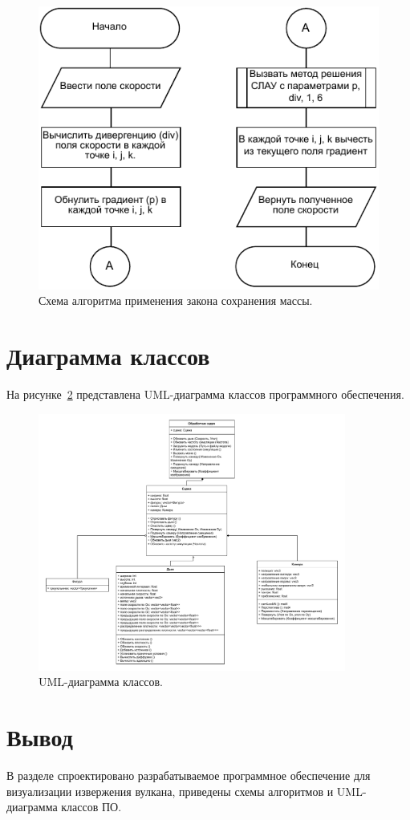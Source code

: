 \begin{figure}[H]
	\centering
	\includegraphics[width=1.0\textwidth,page=1]{assets/img/project.pdf}
	\caption{Схема алгоритма применения закона сохранения массы.}
	\label{fig:project}
\end{figure}

\section{Диаграмма классов}

На рисунке~\ref{fig:uml} представлена UML-диаграмма классов программного обеспечения.

\begin{figure}[H]
	\centering
	\includegraphics[width=0.9\textwidth,page=1]{assets/img/smoke_uml.pdf}
	\caption{UML-диаграмма классов.}
	\label{fig:uml}
\end{figure}

\section*{Вывод}
В разделе спроектировано разрабатываемое программное обеспечение для визуализации извержения вулкана, приведены схемы алгоритмов и UML-диаграмма классов ПО.
